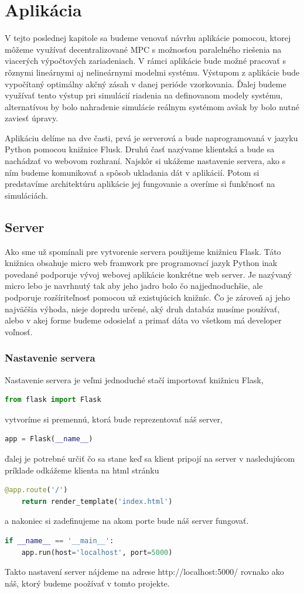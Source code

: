 \chapter{Aplikácia}
\label{part:Aplikacia}

V tejto poslednej kapitole sa budeme venovať návrhu aplikácie pomocou, ktorej môžeme využívať decentralizované MPC s možnosťou paralelného riešenia na viacerých výpočtových zariadeniach. V rámci aplikácie bude možné pracovať s rôznymi lineárnymi aj nelineárnymi modelmi systému. Výstupom z aplikácie bude vypočítaný optimálny akčný zásah v danej perióde vzorkovania. Ďalej budeme využívať tento výstup pri simulácií riadenia na definovanom modely systému, alternatívou by bolo nahradenie simulácie reálnym systémom avšak by bolo nutné zaviesť úpravy. 

Aplikáciu delíme na dve časti, prvá je serverová a bude naprogramovaná v jazyku Python pomocou knižnice Flusk. Druhú časť nazývame klientská a bude sa nachádzať vo webovom rozhraní. Najskôr si ukážeme nastavenie servera, ako s ním budeme komunikovať a spôsob ukladania dát v aplikácií. Potom si predstavíme architektúru aplikácie jej fungovanie a overíme si funkčnosť na simuláciách. 

\section{Server}
Ako sme už spomínali pre vytvorenie servera použijeme knižnicu Flask. Táto knižnica obsahuje micro web framwork pre programovací jazyk Python inak povedané podporuje vývoj webovej aplikácie konkrétne web server. Je nazývaný micro lebo je navrhnutý tak aby jeho jadro bolo čo najjednoduchšie, ale podporuje rozšíriteľnosť pomocou už existujúcich knižníc. Čo je zároveň aj jeho najväčšia výhoda, nieje dopredu určené, aký druh databáz musíme používať, alebo v akej forme budeme odosielať a primať dáta vo všetkom má developer voľnosť.
\subsection{Nastavenie servera}
Nastavenie servera je veľmi jednoduché stačí importovať knižnicu Flask,
\begin{lstlisting}[language=Python]
from flask import Flask
\end{lstlisting}\noindent
vytvoríme si premennú, ktorá bude reprezentovať náš server,
\begin{lstlisting}[language=Python]
app = Flask(__name__)
\end{lstlisting}\noindent
ďalej je potrebné určiť čo sa stane keď sa klient pripojí na server v nasledujúcom príklade odkážeme klienta na html stránku
\begin{lstlisting}[language=Python]
@app.route('/')
	return render_template('index.html')
\end{lstlisting}\noindent
a nakoniec si zadefinujeme na akom porte bude náš server fungovať.
\begin{lstlisting}[language=Python]
if __name__ == '__main__':
	app.run(host='localhost', port=5000)
\end{lstlisting}
Takto nastavení server nájdeme na adrese http://localhost:5000/ rovnako ako náš, ktorý budeme poožívať v tomto projekte.

